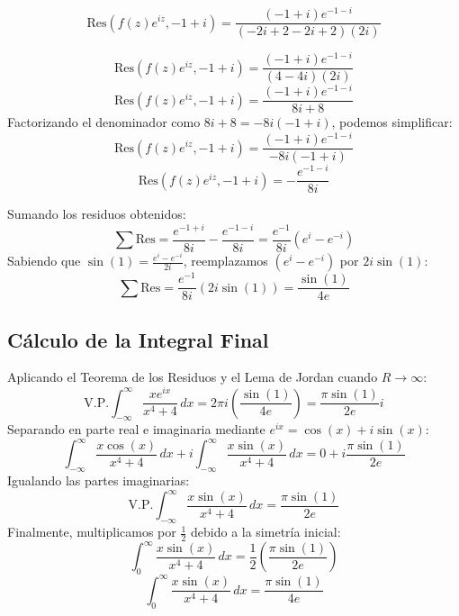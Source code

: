 \documentclass[a4paper, 12pt]{article}
\begin{document}
\[
\text{Res}(f(z)e^{iz}, -1+i) = \frac{(-1+i) e^{-1-i}}{(-2i+2-2i+2)(2i)} 
\]

\[\text{Res}(f(z)e^{iz}, -1+i) = \frac{(-1+i) e^{-1-i}}{(4-4i)(2i)}\]
\[
\text{Res}(f(z)e^{iz}, -1+i) = \frac{(-1+i) e^{-1-i}}
{8i+8}
\]
Factorizando el denominador como $8i+8 = -8i(-1+i)$, podemos simplificar:
\[
\text{Res}(f(z)e^{iz}, -1+i) = \frac{(-1+i) e^{-1-i}}{-8i(-1+i)} \]
\[\text{Res}(f(z)e^{iz}, -1+i) =-\frac{e^{-1-i}}{8i}\]

Sumando los residuos obtenidos:
\[
\sum \text{Res} = \frac{e^{-1+i}}{8i} - \frac{e^{-1-i}}{8i} = \frac{e^{-1}}{8i} (e^i - e^{-i})
\]
Sabiendo que $\sin(1) = \frac{e^i - e^{-i}}{2i}$, reemplazamos $(e^i - e^{-i})$ por $2i\sin(1)$:
\[\boxed{
\sum \text{Res} = \frac{e^{-1}}{8i} (2i \sin(1)) = \frac{\sin(1)}{4e}
}\]
\subsection*{Cálculo de la Integral Final}
Aplicando el Teorema de los Residuos y el Lema de Jordan cuando $R \to \infty$:
\[
\text{V.P.} \int_{-\infty}^{\infty} \frac{x e^{ix}}{x^4 + 4} \, dx = 2\pi i \left( \frac{\sin(1)}{4e} \right) = \frac{\pi \sin(1)}{2e} i
\]
Separando en parte real e imaginaria mediante $e^{ix} = \cos(x) + i\sin(x)$:
\[
\int_{-\infty}^{\infty} \frac{x \cos(x)}{x^4 + 4} \, dx + i \int_{-\infty}^{\infty} \frac{x \sin(x)}{x^4 + 4} \, dx = 0 + i \frac{\pi \sin(1)}{2e}
\]
Igualando las partes imaginarias:
\[
\text{V.P.} \int_{-\infty}^{\infty} \frac{x \sin(x)}{x^4 + 4} \, dx = \frac{\pi \sin(1)}{2e}
\]
Finalmente, multiplicamos por $\frac{1}{2}$ debido a la simetría inicial:
\[
\int_{0}^{\infty} \frac{x \sin(x)}{x^4 + 4} \, dx = \frac{1}{2} \left( \frac{\pi \sin(1)}{2e} \right) 
\]
\[
\boxed{\int_{0}^{\infty} \frac{x \sin(x)}{x^4 + 4} \, dx = \frac{\pi \sin(1)}{4e}}
\]
\end{document}
